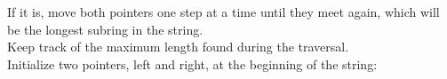 \documentclass[preview]{standalone}
\begin{document}
If it is, move both pointers one step at a time until they meet again, which will be the longest subring in the string.\\Keep track of the maximum length found during the traversal.\\Initialize two pointers, left and right, at the beginning of the string:\\
\end{document}
